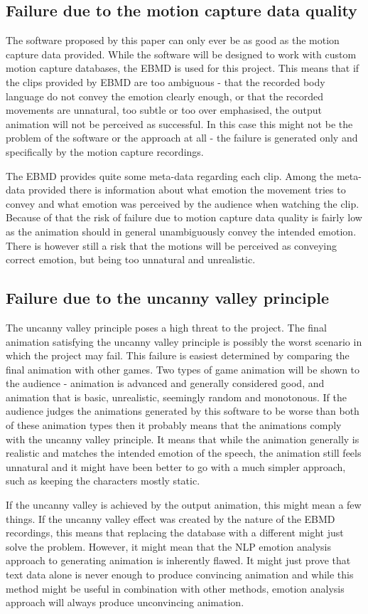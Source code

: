 \subsection{Failure due to the motion capture data quality}
The software proposed by this paper can only ever be as good as the motion capture data provided. While the software will be designed to work with custom motion capture databases, the EBMD is used for this project. This means that if the clips provided by EBMD are too ambiguous - that the recorded body language do not convey the emotion clearly enough, or that the recorded movements are unnatural, too subtle or too over emphasised, the output animation will not be perceived as successful. In this case this might not be the problem of the software or the approach at all - the failure is generated only and specifically by the motion capture recordings.

The EBMD provides quite some meta-data regarding each clip. Among the meta-data provided there is information about what emotion the movement tries to convey and what emotion was perceived by the audience when watching the clip. Because of that the risk of failure due to motion capture data quality is fairly low as the animation should in general unambiguously convey the intended emotion. There is however still a risk that the motions will be perceived as conveying correct emotion, but being too unnatural and unrealistic.

\bigskip
\subsection{Failure due to the uncanny valley principle}
The uncanny valley principle poses a high threat to the project. The final animation satisfying the uncanny valley principle is possibly the worst scenario in which the project may fail. This failure is easiest determined by comparing the final animation with other games. Two types of game animation will be shown to the audience - animation is advanced and generally considered good, and animation that is basic, unrealistic, seemingly random and monotonous. If the audience judges the animations generated by this software to be worse than both of these animation types then it probably means that the animations comply with the uncanny valley principle. It means that while the animation generally is realistic and matches the intended emotion of the speech, the animation still feels unnatural and it might have been better to go with a much simpler approach, such as keeping the characters mostly static.

If the uncanny valley is achieved by the output animation, this might mean a few things. If the uncanny valley effect was created by the nature of the EBMD recordings, this means that replacing the database with a different might just solve the problem. However, it might mean that the NLP emotion analysis approach to generating animation is inherently flawed. It might just prove that text data alone is never enough to produce convincing animation and while this method might be useful in combination with other methods, emotion analysis approach will always produce unconvincing animation.




